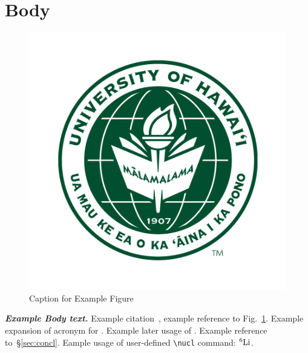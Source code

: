 \section{\label{sec:body}Body}

\begin{figure}[ht]
  \centering
  \includegraphics[width=0.5\linewidth]{figures/seal.jpg}
  \caption{Caption for Example Figure}
  \label{fig:exmp}
\end{figure}

\emph{\textbf{Example Body text.}}
Example citation~\cite{Apollonio:1999jg}, example reference to Fig.~\ref{fig:exmp}.
Example expansion of acronym for \ke.
Example later usage of \ke.
Example reference to~\S\ref{sec:concl}.
Eample usage of user-defined \texttt{\textbackslash nucl} command: ${}^{6}\mbox{Li}$.
\\

\lipsum[4-8]
